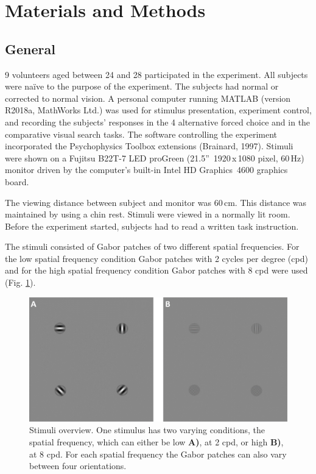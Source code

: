 \newpage
\section{Materials and Methods}
\vspace{5mm}
\subsection{General}

9 volunteers aged between 24 and 28 participated in the experiment. All subjects were naïve to the purpose of the experiment. The subjects had normal or corrected to normal vision.  
A personal computer running MATLAB (version R2018a, MathWorks Ltd.) was used for stimulus presentation, experiment control, and recording the subjects’ responses in the 4 alternative forced choice and in the comparative visual search tasks. The software controlling the experiment incorporated the Psychophysics Toolbox extensions (Brainard, 1997). Stimuli were shown on a  Fujitsu B22T-7 LED proGreen (21.5''~1920\,x\,1080 pixel, 60\,Hz) monitor driven by the computer’s built-in Intel HD Graphics~4600 graphics board.

The viewing distance between subject and monitor was 60\,cm. This distance was maintained by using a chin rest. Stimuli were viewed in a normally lit room. 
Before the experiment started, subjects had to read a written
task instruction.

The stimuli consisted of Gabor patches of two different spatial frequencies. For the low spatial frequency condition Gabor patches with 2 cycles per degree (cpd) and for the high spatial frequency condition Gabor patches with 8 cpd were used (Fig. \ref{fig:all_stimuli}).
\begin{figure}[H]
    \centering
    \includegraphics[width=\textwidth]{Figures/all_stimuli.png}
    \caption[Stimuli overview]{Stimuli overview. One stimulus has two varying conditions, the spatial frequency, which can either be low \textbf{A)}, at 2 cpd, or high \textbf{B)}, at 8 cpd. For each spatial frequency the Gabor patches can also vary between four orientations.}
    \label{fig:all_stimuli}
\end{figure}
\vspace{5mm}
